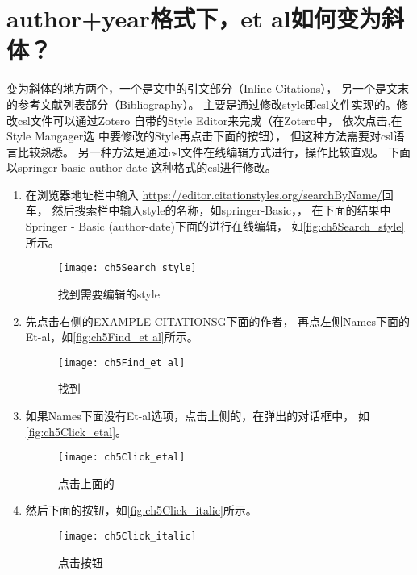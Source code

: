 \documentclass[cn,11pt,chinese]{elegantbook}
\begin{document}
				\section{author+year格式下，et al如何变为斜体？}\label{sec:etal_italic}
				变为斜体的地方两个，一个是文中的引文部分（Inline Citations），
				另一个是文末的参考文献列表部分（Bibliography）。
				主要是通过修改style即csl文件实现的。修改csl文件可以通过Zotero
				自带的Style Editor来完成（在Zotero中，
				依次点击,在Style Mangager选
				中要修改的Style再点击下面的按钮），
				但这种方法需要对csl语言比较熟悉。
				另一种方法是通过csl文件在线编辑方式进行，操作比较直观。
				下面以springer-basic-author-date 这种格式的csl进行修改。	
				\begin{enumerate}
					\item 
					在浏览器地址栏中输入
					\href{https://editor.citationstyles.org/searchByName/}
					{https://editor.citationstyles.org/searchByName/}回车，
					然后搜索栏中输入style的名称，如springer-Basic，，
					在下面的结果中Springer - Basic (author-date)下面的进行在线编辑，
					如\autoref{fig:ch5Search_style}所示。
					\begin{figure}[htbp]
						\centering
						\texttt{[image: ch5Search\_style]}
						\caption{找到需要编辑的style}
						\label{fig:ch5Search_style}
					\end{figure}
				\item 先点击右侧的EXAMPLE CITATIONSG下面的作者，
				再点左侧Names下面的Et-al，如\autoref{fig:ch5Find_et al}所示。
					\begin{figure}[htbp]
						\centering
						\texttt{[image: ch5Find\_et al]}
						\caption{找到}
						\label{fig:ch5Find_et al}
					\end{figure}
				\item 如果Names下面没有Et-al选项，点击上侧的\menu{+}，在弹出的对话框中，
				如\autoref{fig:ch5Click_etal}。
					\begin{figure}[htbp]
						\centering
						\texttt{[image: ch5Click\_etal]}
						\caption{点击上面的\menu{+}}
						\label{fig:ch5Click_etal}
					\end{figure}
				\item 然后下面的按钮，如\autoref{fig:ch5Click_italic}所示。
					\begin{figure}[htbp]
						\centering
						\texttt{[image: ch5Click\_italic]}
						\caption{点击按钮}
						\label{fig:ch5Click_italic}
					\end{figure}
				\end{enumerate}
\end{document}
